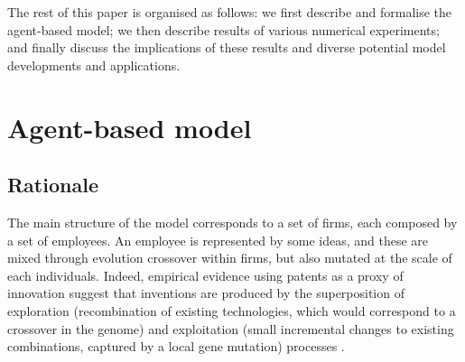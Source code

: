 \documentclass[letterpaper]{article}
\begin{document}
The rest of this paper is organised as follows: we first describe and formalise the agent-based model; we then describe results of various numerical experiments; and finally discuss the implications of these results and diverse potential model developments and applications.


\section{Agent-based model}



\subsection{Rationale}

The main structure of the model corresponds to a set of firms, each composed by a set of employees. An employee is represented by some ideas, and these are mixed through evolution crossover within firms, but also mutated at the scale of each individuals. Indeed, empirical evidence using patents as a proxy of innovation suggest that inventions are produced by the superposition of exploration (recombination of existing technologies, which would correspond to a crossover in the genome) and exploitation (small incremental changes to existing combinations, captured by a local gene mutation) processes \citep{youn2015invention}. 
\end{document}
